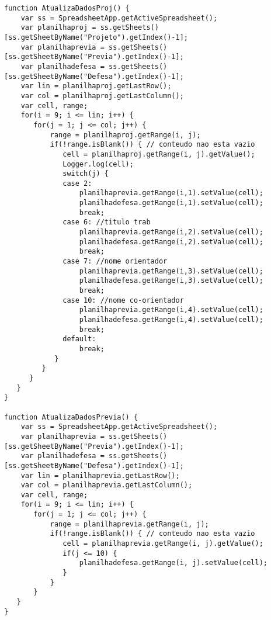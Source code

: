 \begin{lstlisting}
function AtualizaDadosProj() {
    var ss = SpreadsheetApp.getActiveSpreadsheet();
    var planilhaproj = ss.getSheets()[ss.getSheetByName("Projeto").getIndex()-1];
    var planilhaprevia = ss.getSheets()[ss.getSheetByName("Previa").getIndex()-1];
    var planilhadefesa = ss.getSheets()[ss.getSheetByName("Defesa").getIndex()-1];
    var lin = planilhaproj.getLastRow();
    var col = planilhaproj.getLastColumn();
    var cell, range;
    for(i = 9; i <= lin; i++) {
       for(j = 1; j <= col; j++) {
           range = planilhaproj.getRange(i, j);
           if(!range.isBlank()) { // conteudo nao esta vazio
              cell = planilhaproj.getRange(i, j).getValue();
              Logger.log(cell);
              switch(j) {
              case 2:  
                  planilhaprevia.getRange(i,1).setValue(cell);
                  planilhadefesa.getRange(i,1).setValue(cell);
                  break;
              case 6: //titulo trab
                  planilhaprevia.getRange(i,2).setValue(cell);
                  planilhadefesa.getRange(i,2).setValue(cell);
                  break;
              case 7: //nome orientador
                  planilhaprevia.getRange(i,3).setValue(cell);
                  planilhadefesa.getRange(i,3).setValue(cell);
                  break;
              case 10: //nome co-orientador
                  planilhaprevia.getRange(i,4).setValue(cell);
                  planilhadefesa.getRange(i,4).setValue(cell);
                  break;
              default:
                  break;
            }
         }
      }
   }
}

function AtualizaDadosPrevia() {
    var ss = SpreadsheetApp.getActiveSpreadsheet();
    var planilhaprevia = ss.getSheets()[ss.getSheetByName("Previa").getIndex()-1];
    var planilhadefesa = ss.getSheets()[ss.getSheetByName("Defesa").getIndex()-1];
    var lin = planilhaprevia.getLastRow();
    var col = planilhaprevia.getLastColumn();
    var cell, range;
    for(i = 9; i <= lin; i++) {
       for(j = 1; j <= col; j++) {
           range = planilhaprevia.getRange(i, j);
           if(!range.isBlank()) { // conteudo nao esta vazio
              cell = planilhaprevia.getRange(i, j).getValue();
              if(j <= 10) {
                  planilhadefesa.getRange(i, j).setValue(cell);
              }
           }
       }
   }
}

\end{lstlisting}
